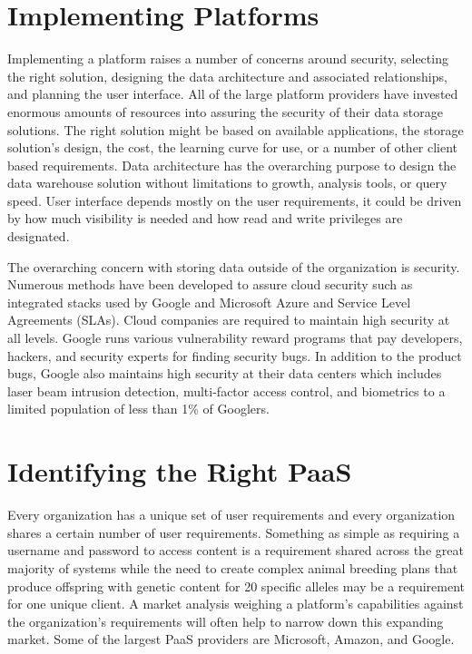 \documentclass[sigconf]{acmart}
\begin{document}
\section{Implementing Platforms}
Implementing a platform raises a number of concerns around security, selecting the right solution, designing the data architecture and associated relationships, and planning the user interface. All of the large platform providers have invested enormous amounts of resources into assuring the security of their data storage solutions. The right solution might be based on available applications, the storage solution's design, the cost, the learning curve for use, or a number of other client based requirements. Data architecture has the overarching purpose to design the data warehouse solution without limitations to growth, analysis tools, or query speed. User interface depends mostly on the user requirements, it could be driven by how much visibility is needed and how read and write privileges are designated. 

The overarching concern with storing data outside of the organization is security. Numerous methods have been developed to assure cloud security such as integrated stacks used by Google and Microsoft Azure and Service Level Agreements (SLAs)\cite{Casola}. Cloud companies are required to maintain high security at all levels. Google runs various vulnerability reward programs that pay developers, hackers, and security experts for finding security bugs. In addition to the product bugs, Google also maintains high security at their data centers which includes laser beam intrusion detection, multi-factor access control, and biometrics to a limited population of less than 1\% of Googlers\cite{www-gcp_security}. 

\section{Identifying the Right PaaS}
Every organization has a unique set of user requirements and every organization shares a certain number of user requirements. Something as simple as requiring a username and password to access content is a requirement shared across the great majority of systems while the need to create complex animal breeding plans that produce offspring with genetic content for 20 specific alleles may be a requirement for one unique client. A market analysis weighing a platform's capabilities against the organization's requirements will often help to narrow down this expanding market. Some of the largest PaaS providers are Microsoft, Amazon, and Google. 
\end{document}
